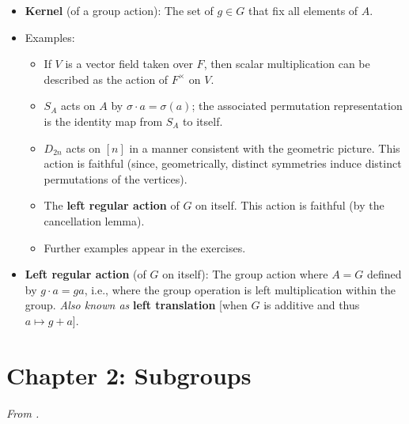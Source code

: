 \documentclass[../notes.tex]{subfiles}
\begin{document}
\begin{itemize}
    \item \textbf{Kernel} (of a group action): The set of $g\in G$ that fix all elements of $A$.
    \item Examples:
    \begin{itemize}
        \item If $V$ is a vector field taken over $F$, then scalar multiplication can be described as the action of $F^\times$ on $V$.
        \item $S_A$ acts on $A$ by $\sigma\cdot a=\sigma(a)$; the associated permutation representation is the identity map from $S_A$ to itself.
        \item $D_{2n}$ acts on $[n]$ in a manner consistent with the geometric picture. This action is faithful (since, geometrically, distinct symmetries induce distinct permutations of the vertices).
        \item The \textbf{left regular action} of $G$ on itself. This action is faithful (by the cancellation lemma).
        \item Further examples appear in the exercises.
    \end{itemize}
    \item \textbf{Left regular action} (of $G$ on itself): The group action where $A=G$ defined by $g\cdot a=ga$, i.e., where the group operation is left multiplication within the group. \emph{Also known as} \textbf{left translation} [when $G$ is additive and thus $a\mapsto g+a$].
\end{itemize}



\section{Chapter 2: Subgroups}
\emph{From \textcite{bib:DummitFoote}.}
\end{document}
